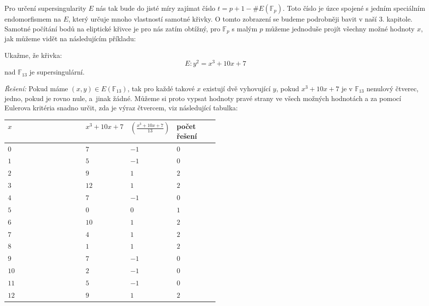 \documentclass [12pt]{report}
\begin{document}
Pro určení supersingularity $E$ nás tak bude do jisté míry zajímat číslo $t = p+1 - \# E(\mathbb{F}_p)$. Toto číslo je úzce spojené s jedním speciálním endomorfismem na $E$, který určuje mnoho vlastností samotné křivky. O tomto zobrazení se budeme podrobněji bavit v naší 3. kapitole.\\

Samotné počítání bodů na eliptické křivce je pro nás zatím obtížný, pro $\mathbb{F}_p$ s malým $p$ můžeme jednoduše projít všechny možné hodnoty $x$, jak můžeme vidět na následujícím příkladu:

\begin{priklad}
Ukažme, že křivka:
$$E: y^2 = x^3+10x+7$$
nad $\mathbb{F}_{13}$ je supersingulární.
\end{priklad}
\textit{Řešení: } Pokud máme $(x,y) \in E(\mathbb{F}_{13})$, tak pro každé takové $x$ existují dvě vyhovující $y$, pokud $x^3+10x+7$ je v $\mathbb{F}_{13}$ nenulový čtverec, jedno, pokud je rovno nule, a~jinak žádné. Můžeme si proto vypsat hodnoty pravé strany ve všech možných hodnotách a za pomocí Eulerova kritéria snadno určit, zda je výraz čtvercem, viz následující tabulka:
\begin{longtable}[H]{l>{\centering}p{0.2\linewidth}>{\raggedleft}p{0.1\linewidth}>{\centering\arraybackslash}p{0.2\linewidth}}
\toprule
$x$ & $x^3+10x+7$ & $\genfrac{(}{)}{}{}{x^3+10x+7}{13}$ & počet řešení\\
\midrule
$0$ & $7$  & $-1$  & $0$\\
$1$ & $5$  & $-1$  & $0$\\
$2$ & $9$  & $1$  & $2$\\
$3$ & $12$  & $1$  & $2$\\
$4$ & $7$  & $-1$  & $0$\\
$5$ & $0$  & $0$  & $1$\\
$6$ & $10$  & $1$  & $2$\\
$7$ & $4$  & $1$  & $2$\\
$8$ & $1$  & $1$  & $2$\\
$9$ & $7$  & $-1$  & $0$\\
$10$ & $2$  & $-1$  & $0$\\
$11$ & $5$  & $-1$  & $0$\\
$12$ & $9$  & $1$  & $2$\\
\bottomrule 
\end{longtable}
\end{document}
